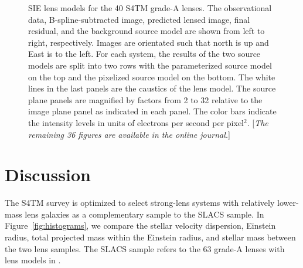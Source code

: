 \documentclass{emulateapj}
\begin{document}
\begin{figure*}[htbp]
\centerline{}
\centerline{}
\centerline{}
\centerline{}
\caption{\label{fig:models_1} SIE lens models for the 40 S4TM grade-A lenses. The observational data, B-spline-subtracted image, predicted lensed image, final residual, and the background source model are shown from left to right, respectively. Images are orientated such that north is up and East is to the left. For each system, the results of the two source models are split into two rows with the parameterized source model on the top and the pixelized source model on the bottom. The white lines in the last panels are the caustics of the lens model. The source plane panels are magnified by factors from 2 to 32 relative to the image plane panel as indicated in each panel. The color bars indicate the intensity levels in units of electrons per second per pixel$^2$. [\textit{The remaining 36 figures are available in the online journal.}]}
\end{figure*}

\section{Discussion}
\label{sect:discussion}

The S4TM survey is optimized to select strong-lens systems with relatively lower-mass lens 
galaxies as a complementary sample to the SLACS sample. 
In Figure~\ref{fig:histograms}, we compare the stellar velocity dispersion, Einstein radius, 
total projected mass within the Einstein radius, and stellar mass 
between the two lens samples. The SLACS sample refers to the 63 grade-A lenses 
with lens models in \citet{SLACSV}. 
\end{document}
